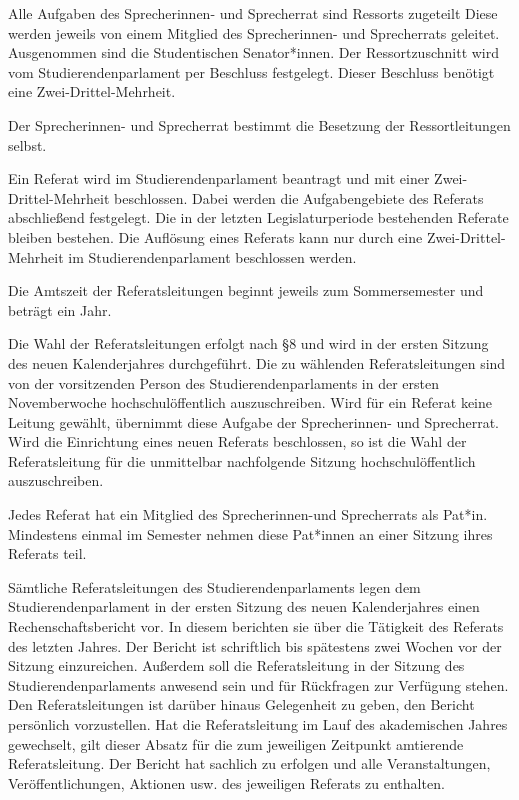 \documentclass[10pt,a4paper]{scrartcl}
\begin{document}
\begin{contract}
\label{der-sprecherinnen--und-sprecherrat}

Alle Aufgaben des Sprecherinnen- und Sprecherrat sind Ressorts zugeteilt Diese
werden jeweils von einem Mitglied des Sprecherinnen- und Sprecherrats geleitet.
Ausgenommen sind die Studentischen Senator*innen. Der Ressortzuschnitt wird
vom Studierendenparlament per Beschluss festgelegt. Dieser Beschluss benötigt
eine Zwei-Drittel-Mehrheit.

Der Sprecherinnen- und Sprecherrat bestimmt die Besetzung der Ressortleitungen
selbst.

Ein Referat wird im Studierendenparlament beantragt und mit einer
Zwei-Drittel-Mehrheit beschlossen. Dabei werden die Aufgabengebiete des Referats
abschließend festgelegt. Die in der letzten Legislaturperiode bestehenden
Referate bleiben bestehen. Die Auflösung eines Referats kann nur durch eine
Zwei-Drittel-Mehrheit im Studierendenparlament beschlossen werden.

Die Amtszeit der Referatsleitungen beginnt jeweils zum Sommersemester und
beträgt ein Jahr.

Die Wahl der Referatsleitungen erfolgt nach §8 und wird in der ersten Sitzung
des neuen Kalenderjahres durchgeführt. Die zu wählenden Referatsleitungen sind
von der vorsitzenden Person des Studierendenparlaments in der ersten
Novemberwoche hochschulöffentlich auszuschreiben. Wird für ein Referat keine
Leitung gewählt, übernimmt diese Aufgabe der Sprecherinnen- und Sprecherrat.
Wird die Einrichtung eines neuen Referats beschlossen, so ist die Wahl der
Referatsleitung für die unmittelbar nachfolgende Sitzung hochschulöffentlich
auszuschreiben.

Jedes Referat hat ein Mitglied des Sprecherinnen-und Sprecherrats
als Pat*in. Mindestens einmal im Semester nehmen diese Pat*innen an
einer Sitzung ihres Referats teil.

Sämtliche Referatsleitungen des Studierendenparlaments legen dem
Studierendenparlament in der ersten Sitzung des neuen Kalenderjahres einen
Rechenschaftsbericht vor. In diesem berichten sie über die Tätigkeit des
Referats des letzten Jahres. Der Bericht ist schriftlich bis spätestens zwei
Wochen vor der Sitzung einzureichen. Außerdem soll die Referatsleitung in der
Sitzung des Studierendenparlaments anwesend sein und für Rückfragen zur
Verfügung stehen. Den Referatsleitungen ist darüber hinaus Gelegenheit zu geben,
den Bericht persönlich vorzustellen. Hat die Referatsleitung im Lauf des
akademischen Jahres gewechselt, gilt dieser Absatz für die zum jeweiligen
Zeitpunkt amtierende Referatsleitung. Der Bericht hat sachlich zu erfolgen und
alle Veranstaltungen, Veröffentlichungen, Aktionen usw. des jeweiligen Referats
zu enthalten.


\end{contract}
\end{document}
